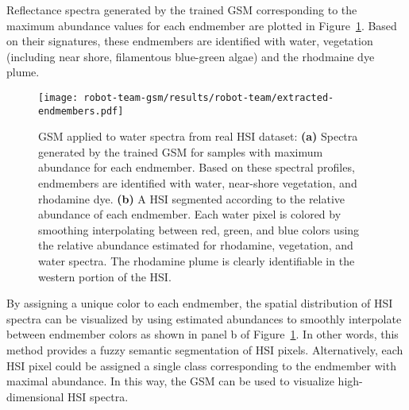 Reflectance spectra generated by the trained GSM corresponding to the maximum
abundance values for each endmember are plotted in
Figure~\ref{fig:robot-team-endmembers}. Based on their signatures, these
endmembers are identified with water, vegetation (including near shore,
filamentous blue-green algae) and the rhodmaine dye plume.

\begin{figure}[H]
  \centering
  \texttt{[image: robot-team-gsm/results/robot-team/extracted-endmembers.pdf]}
  \caption{GSM applied to water spectra from real HSI dataset: \textbf{(a)}
    Spectra generated by the trained GSM for samples with maximum abundance for
    each endmember. Based on these spectral profiles, endmembers are identified
    with water, near-shore vegetation, and rhodamine dye. \textbf{(b)} A HSI
    segmented according to the relative abundance of each endmember. Each water
    pixel is colored by smoothing interpolating between red, green, and blue
    colors using the relative abundance estimated for rhodamine, vegetation, and
    water spectra. The rhodamine plume is clearly identifiable in the western
    portion of the HSI.}
  \label{fig:robot-team-endmembers}
\end{figure}






By assigning a unique color to each endmember, the spatial distribution of HSI
spectra can be visualized by using estimated abundances to smoothly interpolate
between endmember colors as shown in panel b of
Figure~\ref{fig:robot-team-endmembers}. In other words, this method provides a
fuzzy semantic segmentation of HSI pixels. Alternatively, each HSI pixel could
be assigned a single class corresponding to the endmember with maximal
abundance. In this way, the GSM can be used to visualize high-dimensional HSI
spectra.



